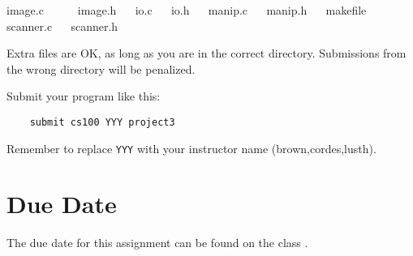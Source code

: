 \documentclass[12pt]{article}
\begin{document}
{\color{red} image.c ~~ ~~ image.h ~~ io.c ~~ io.h ~~ manip.c ~~ manip.h
~~ makefile ~~ scanner.c ~~ scanner.h }

Extra files are OK, as long as you are in the correct directory. 
Submissions from the wrong directory
will be penalized.

Submit your program like this:

\begin{verbatim}
    submit cs100 YYY project3
\end{verbatim}

Remember to replace \verb!YYY! with your instructor name
(brown,cordes,lusth).

\section*{Due Date}

The due date for this assignment can be found on the class
.
\end{document}
